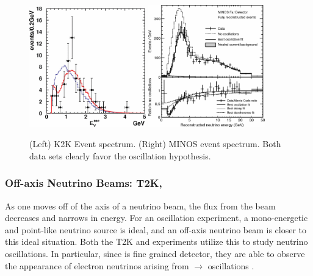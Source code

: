 \begin{figure}[htbp]
  \centering
  \includegraphics[width=0.45\textwidth]{intro_figures/k2k_oscillations.png}
  \includegraphics[width=0.45\textwidth]{intro_figures/minos_oscillations.png}
  \caption[MINOS and K2K \numu Oscillations]{(Left) K2K Event spectrum. (Right) MINOS event spectrum.  Both data sets clearly favor the oscillation hypothesis.}
  \label{fig:label}
\end{figure}

\subsubsection{Off-axis Neutrino Beams: T2K, \nova}
As one moves off of the axis of a neutrino beam, the flux from the beam decreases and narrows in energy.  For an oscillation experiment, a mono-energetic and point-like neutrino source is ideal, and an off-axis neutrino beam is closer to this ideal situation.  Both the T2K \cite{PhysRevLett.112.181801} and \nova \cite{PhysRevD.93.051104} experiments utilize this to study neutrino oscillations.  In particular, since \nova is fine grained detector, they are able to observe the appearance of electron neutrinos arising from \numu $\rightarrow$ \nue oscillations \cite{Adamson:2016tbq}.

